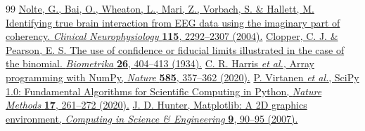 \begin{thebibliography}{99}
 \href{https://doi.org/10.1016/j.clinph.2004.04.029}{Nolte, G., Bai, O., Wheaton, L., Mari, Z., Vorbach, S. \& Hallett, M.
Identifying true brain interaction from EEG data using the imaginary part of coherency.
\emph{Clinical Neurophysiology} \textbf{115}, 2292--2307 (2004).}
 \href{https://doi.org/10.1093/biomet/26.4.404}{Clopper, C. J. \& Pearson, E. S. The use of confidence or fiducial limits illustrated in the case of the binomial. \emph{Biometrika} \textbf{26}, 404--413 (1934).}
 \href{https://doi.org/10.1038/s41586-020-2649-2}{C. R. Harris \emph{et al.}, Array programming with NumPy, \emph{Nature} \textbf{585}, 357--362 (2020).}
 \href{https://doi.org/10.1038/s41592-019-0686-2}{P. Virtanen \emph{et al.}, SciPy 1.0: Fundamental Algorithms for Scientific Computing in Python, \emph{Nature Methods} \textbf{17}, 261--272 (2020).}
 \href{https://doi.org/10.1109/MCSE.2007.55}{J. D. Hunter, Matplotlib: A 2D graphics environment, \emph{Computing in Science \& Engineering} \textbf{9}, 90--95 (2007).}
\end{thebibliography}
